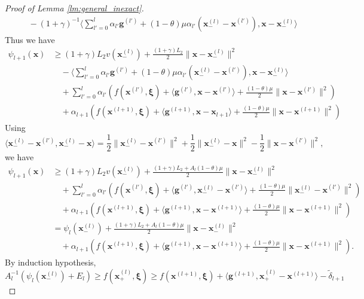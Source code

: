 \documentclass[11pt,fullpage,letterpaper]{article}
\newcommand{\mb}{\mathbf}
\newcommand{\bx}{\boldsymbol{\xi}}
\begin{document}
\begin{proof}[Proof of Lemma \ref{lm:general_inexact}]
\begin{align*}
    &\quad - (1+\gamma)^{-1}\langle \sum_{l'=0}^{l}\alpha_{l'}\mb g^{(l')}+(1-\theta)\mu\alpha_{l'}(\mb x_-^{(l)} - \mb x^{(l')}),\mb x-\mb x_-^{(l)}\rangle
\end{align*}
Thus we have
\begin{align*}
    \psi_{l+1}(\mb x) &\geq (1+\gamma)L_2 v(\mb x_-^{(l)}) + \frac{(1+\gamma)L_2}{2}\|\mb x-\mb x_-^{(l)}\|^2 \\
    &\quad - \langle \sum_{l'=0}^{l}\alpha_{l'}\mb g^{(l')}+(1-\theta)\mu\alpha_{l'}(\mb x_-^{(l)} - \mb x^{(l')}),\mb x-\mb x_-^{(l)}\rangle \\
    &\quad+ \sum_{l'=0}^{l}\alpha_{l'}(f(\mb x^{(l')},\bx) + \langle \mb g^{(l')},\mb x- \mb x^{(l')}\rangle+\frac{(1-\theta)\mu}{2} \|\mb x- \mb x^{(l')}\|^2)\\
    &\quad + \alpha_{l+1}(f(\mb x^{(l+1)},\bx) +\langle \mb g^{(l+1)},\mb x-\mb x_{l+1}\rangle + \frac{(1-\theta)\mu}{2}\|\mb x - \mb x^{(l+1)}\|^2)
\end{align*}
Using 
\begin{displaymath}
    \langle \mb x_-^{(l)} - \mb x^{(l')} , \mb x_-^{(l)} - \mb x\rangle  = \frac{1}{2}\|\mb x_-^{(l)} - \mb x^{(l')}\|^2 + \frac{1}{2}\|\mb x_-^{(l)} - \mb x\|^2 - \frac{1}{2}\|\mb x - \mb x^{(l')}\|^2,
\end{displaymath}
we have
\begin{align*}
    \psi_{l+1}(\mb x) &\geq (1+\gamma)L_2 v(\mb x_-^{(l)}) +  \frac{(1+\gamma)L_2+A_l(1-\theta)\mu}{2}\|\mb x-\mb x_-^{(l)}\|^2 \\
    &\quad+\sum_{l'=0}^{l}\alpha_{l'}(f(\mb x^{(l')},\bx) + \langle \mb g^{(l')},\mb x_-^{(l)}- \mb x^{(l')}\rangle+\frac{(1-\theta)\mu}{2} \|\mb x_-^{(l)}- \mb x^{(l')}\|^2)\\
    &\quad + \alpha_{l+1}(f(\mb x^{(l+1)},\bx) +\langle \mb g^{(l+1)},\mb x-\mb x^{(l+1)}\rangle + \frac{(1-\theta)\mu}{2}\|\mb x - \mb x^{(l+1)}\|^2)\\
    & = \psi_l(\mb x_-^{(l)}) + \frac{(1+\gamma)L_2+A_l(1-\theta)\mu}{2}\|\mb x-\mb x_-^{(l)}\|^2\nonumber\\
    &\quad +\alpha_{l+1}(f(\mb x^{(l+1)},\bx) +\langle \mb g^{(l+1)},\mb x-\mb x^{(l+1)}\rangle + \frac{(1-\theta)\mu}{2}\|\mb x - \mb x^{(l+1)}\|^2).
\end{align*}
By induction hypothesis, 
\begin{displaymath}
    A_l^{-1}(\psi_l(\mb x_-^{(l)}) +E_l) \geq f(\mb x_+^{(l)},\bx) \geq f(\mb x^{(l+1)},\bx) + \langle \mb g^{(l+1)},\mb x_+^{(l)}-\mb x^{(l+1)}\rangle  - \tilde{\delta}_{l+1}

\end{displaymath}
\end{proof}
\end{document}
